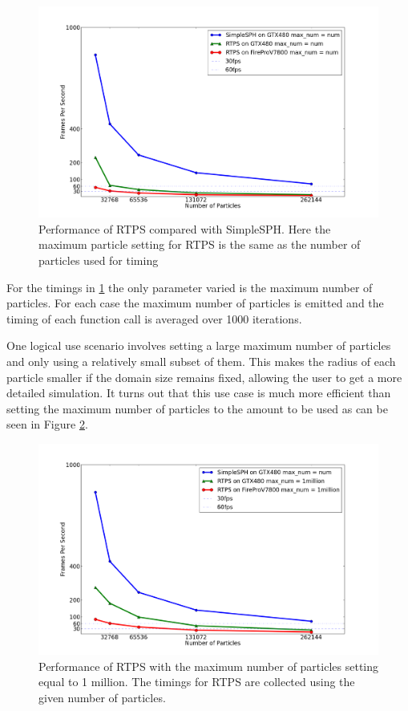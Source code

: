 \begin{figure}[!htc]
 		\centering
        \includegraphics[width=\columnwidth]{figures/maxnum_eq_num_fps.png}
        \caption{ {\footnotesize Performance of RTPS compared with SimpleSPH. Here the maximum
        particle setting for RTPS is the same as the number of particles used
        for timing}}
        \label{fig:fps_num}
\end{figure}

For the timings in \ref{fig:fps_num} the only parameter varied is the maximum number of particles.
For each case the maximum number of particles is emitted and the timing of each
function call is averaged over 1000 iterations.


One logical use scenario involves setting a large maximum number of
particles and only using a relatively small subset of them. This makes the
radius of each particle smaller if the domain size remains fixed, allowing the
user to get a more detailed simulation. It turns out that this use case is much
more efficient than setting the maximum number of particles to the amount to be
used as can be seen in Figure \ref{fig:fps_1mill}.


\begin{figure}[!htc]
 		\centering
        \includegraphics[width=\columnwidth]{figures/maxnum_eq_1mill_fps.png}
        \caption{ {\small Performance of RTPS with the maximum number of particles
        setting equal to 1 million. The timings for RTPS are collected using
        the given number of particles.}}
        \label{fig:fps_1mill}
\end{figure}

